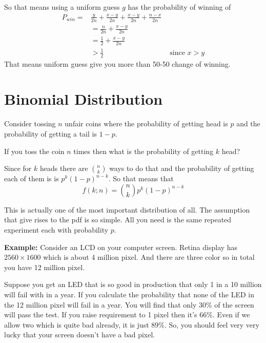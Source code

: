\documentclass[a4paper, 12pt]{article}
\newcommand{\example}{\vspace{1em}\noindent\textbf{Example:} }
\begin{document}
\begin{multicols}{2}
	So that means using a uniform guess $g$ has the probability of winning of
\begin{align*}
	P_{win} =& \frac{y}{2n} + \frac{x-y}{2n} + \frac{x-y}{2n} + \frac{n-x}{2n}\\
	&= \frac{n}{2n} + \frac{x-y}{2n}\\
	&= \frac{1}{2} + \frac{x-y}{2n}\\
	&> \frac{1}{2} &\text{ since $x>y$}
\end{align*}
That means uniform guess give you more than 50-50 change of winning.

\section*{Binomial Distribution}

Consider tossing $n$ unfair coins where the probability of getting head is $p$ and the probability of getting a tail is $1-p$.

If you toss the coin $n$ times then what is the probability of getting $k$ head?

Since for $k$ heads there are $\displaystyle {n \choose k}$ ways to do that and the probability of getting each of them is is $p^k(1-p)^{n-k}$. So that means that
\[
	f(k; n) = {n \choose k}p^k(1-p)^{n-k}
\]

This is actually one of the most important distribution of all. The assumption that give rises to the pdf is so simple. All you need is the same repeated experiment each with probability $p$.

\example Consider an LCD on your computer screen. Retina display has $2560\times1600$ which is about 4 million pixel. And there are three color so in total you have 12 million pixel.

Suppose you get an LED that is so good in production that only 1 in a 10 million will fail with in a year. If you calculate the probability that none of the LED in the 12 million pixel will fail in a year. You will find that only 30\% of the screen will pass the test. If you raise requirement to 1 pixel then it's $66\%$. Even if we allow two which is quite bad already, it is just $89\%$. So, you should feel very very lucky that your screen doesn't have a bad pixel.

%


\end{multicols}
\end{document}
